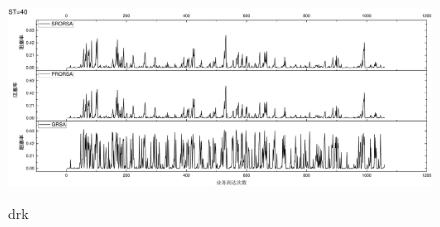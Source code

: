 \begin{figure}
\setlength{\belowcaptionskip}{-0.5cm}
  \begin{center}
    {\includegraphics[width=1 \textwidth]{figures/H40Z.pdf}}
    \end{center}
  \caption{{\footnotesize{drk}}}
  \label{drk}
\end{figure}







